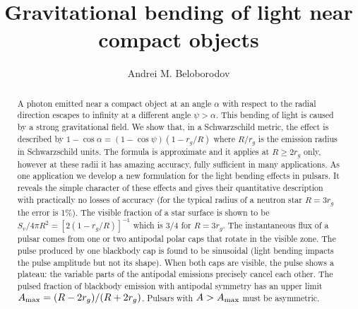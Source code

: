 \documentclass{article}
\def\Am{A_{\rm max}}
\begin{document}
\title{Gravitational bending of light near compact objects}


\author{Andrei M. Beloborodov} 


\begin{abstract}
A photon emitted near a compact object at an angle $\alpha$ with respect 
to the radial direction escapes to infinity at a different angle 
$\psi>\alpha$. This bending of light is caused by a strong gravitational
field. We show that, in a Schwarzschild metric, the effect is described by 
$1-\cos\alpha=(1-\cos\psi)(1-r_g/R)$ where $R/r_g$ is the emission radius 
in Schwarzschild units. The formula is approximate and it applies at 
$R\geq 2r_g$ only, however at these radii it has amazing accuracy, fully 
sufficient in many applications. As one application we develop a new 
formulation for the light bending effects in pulsars. It reveals the simple 
character of these effects and gives their quantitative description with 
practically no losses of accuracy (for the typical radius of a neutron star 
$R=3r_g$ the error is  1\%). The visible fraction of a star surface is shown 
to be $S_v/4\pi R^2=[2(1-r_g/R)]^{-1}$ which is $3/4$ for $R=3r_g$. 
The instantaneous flux of a pulsar comes from one or two antipodal polar 
caps that rotate in the visible zone. The pulse produced by one blackbody 
cap is found to be sinusoidal (light bending impacts the pulse amplitude but 
not its shape). When both caps are visible, the pulse shows a plateau: the 
variable parts of the antipodal emissions precisely cancel each other. 
The pulsed fraction of blackbody emission with antipodal symmetry has an 
upper limit $\Am=(R-2r_g)/(R+2r_g)$. Pulsars with $A>\Am$ must be asymmetric.
\end{abstract}




\bigskip

\medskip
\end{document}
